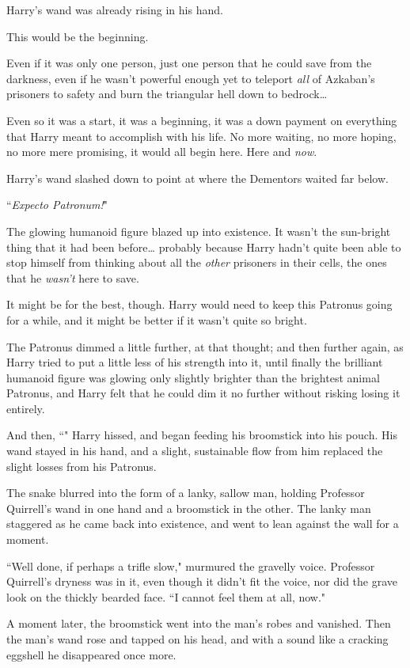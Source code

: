 Harry's wand was already rising in his hand.

This would be the beginning.

Even if it was only one person, just one person that he could save from the darkness, even if he wasn't powerful enough yet to teleport \emph{all} of Azkaban's prisoners to safety and burn the triangular hell down to bedrock{\ldots}

Even so it was a start, it was a beginning, it was a down payment on everything that Harry meant to accomplish with his life. No more waiting, no more hoping, no more mere promising, it would all begin here. Here and \emph{now}.

Harry's wand slashed down to point at where the Dementors waited far below.

``\emph{Expecto Patronum!}"

The glowing humanoid figure blazed up into existence. It wasn't the sun-bright thing that it had been before{\ldots} probably because Harry hadn't quite been able to stop himself from thinking about all the \emph{other} prisoners in their cells, the ones that he \emph{wasn't} here to save.

It might be for the best, though. Harry would need to keep this Patronus going for a while, and it might be better if it wasn't quite so bright.

The Patronus dimmed a little further, at that thought; and then further again, as Harry tried to put a little less of his strength into it, until finally the brilliant humanoid figure was glowing only slightly brighter than the brightest animal Patronus, and Harry felt that he could dim it no further without risking losing it entirely.

And then, ``" Harry hissed, and began feeding his broomstick into his pouch. His wand stayed in his hand, and a slight, sustainable flow from him replaced the slight losses from his Patronus.

The snake blurred into the form of a lanky, sallow man, holding Professor Quirrell's wand in one hand and a broomstick in the other. The lanky man staggered as he came back into existence, and went to lean against the wall for a moment.

``Well done, if perhaps a trifle slow," murmured the gravelly voice. Professor Quirrell's dryness was in it, even though it didn't fit the voice, nor did the grave look on the thickly bearded face. ``I cannot feel them at all, now."

A moment later, the broomstick went into the man's robes and vanished. Then the man's wand rose and tapped on his head, and with a sound like a cracking eggshell he disappeared once more.

